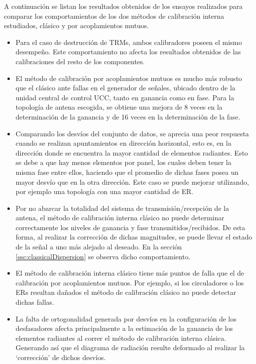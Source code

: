 A continuación se listan los resultados obtenidos de los ensayos realizados para comparar los comportamientos de los dos métodos
de calibración interna estudiados, clásico y por acoplamientos mutuos. 
\begin{itemize}
	\item Para el caso de destrucción de TRMs, ambos calibradores poseen el mismo desempeño. Este comportamiento no afecta los
		resultados obtenidos de las calibraciones del resto de los componentes.
		
	\item El método de calibración por acoplamientos mutuos es mucho más robusto que el clásico ante fallas en el generador de
		señales, ubicado dentro de la unidad central de control UCC, tanto en ganancia como en fase. Para la topología de antena
		escogida, se obtiene una mejora de 8 veces en la determinación de la ganancia y de 16 veces en la determinación de la
		fase.
	\item Comparando los desvíos del conjunto de datos, se aprecia una peor respuesta cuando se realizan apuntamientos 
		en dirección horizontal, esto es, en la dirección donde se encuentra la mayor cantidad de elementos radiantes. Esto se
		debe a que hay menos elementos por panel, los cuales deben tener la misma fase entre ellos, haciendo que el promedio de
		dichas fases posea un mayor desvío que en la otra dirección. Este caso se puede mejorar utilizando, por ejemplo una
		topología con una mayor cantidad de ER.
	\item Por no abarcar la totalidad del sistema de transmisión/recepción de la antena, el método de calibración interna clásico
		no puede determinar correctamente los niveles de ganancia y fase transmitidos/recibidos. De esta forma, al realizar la
		corrección de dichas magnitudes, se puede llevar el estado de la señal a uno más alejado al deseado. En la sección
		\ref{ssc:classicalDispersion} se observa dicho comportamiento. 
	\item El método de calibración interna clásico tiene más puntos de falla que el de calibración por acoplamientos mutuos. Por
		ejemplo, si los circuladores o los ERs resultan dañados el método de calibración clásico no puede detectar dichas fallas.
	\item La falta de ortogonalidad generada por desvíos en la configuración de los desfasadores afecta principalmente a la 
		estimación de la ganancia de los elementos radiantes al correr el método de calibración interna clásica. Generando así
		que el diagrama de radiación resulte deformado al realizar la \enquote*{corrección} de dichos desvíos.


\end{itemize}
